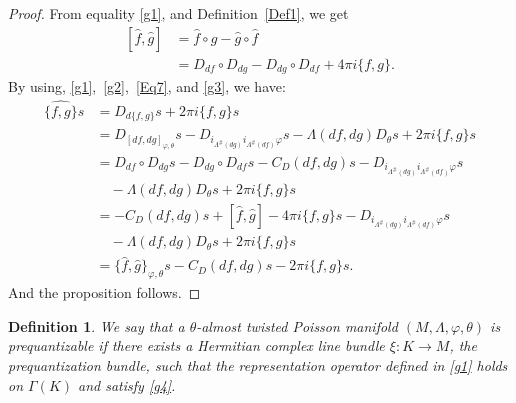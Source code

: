\documentclass[a4paper,10pt]{article}
\numberwithin{equation}{section}
\theoremstyle{plain}
\newtheorem{definition}[theorem]{Definition}
\begin{document}
	\begin{proof}
		From equality \eqref{g1}, and Definition~\ref{Def1}, we get
		\begin{align}\label{g3}
		\nonumber
		[\hat{f},\hat{g}]&=\hat{f}\circ\hat{g}-\hat{g}\circ\hat{f}\\
		&= D_{df}\circ D_{dg}-D_{dg}\circ D_{df}+ 4\pi i\{f,g\}.
		\end{align}
		By using, \eqref{g1},~\eqref{g2},~\eqref{Eq7}, and \eqref{g3}, we have:
		\begin{align*}
		\widehat{\{f,g\}}s&=D_{d\{f,g\}}s+2\pi i\{f,g\}s \\
		&=D_{[df,dg]_{\varphi,\theta}}s-D_{i_{\Lambda^{\#}(dg)}i_{\Lambda^{\#}(df)}\varphi}s-\Lambda(df,dg)D_\theta s+2\pi i\{f,g\}s\\
		&=D_{df}\circ D_{dg}s-D_{dg}\circ D_{df}s -C_D(df,dg)s-D_{i_{\Lambda^{\#}(dg)}i_{\Lambda^{\#}(df)}\varphi}s\\
		&\quad- \Lambda(df,dg)D_\theta s+2\pi i\{f,g\}s\\
		&=-C_D(df,dg)s+[\hat{f},\hat{g}]-4\pi i\{f,g\}s-D_{i_{\Lambda^{\#}(dg)}i_{\Lambda^{\#}(df)}\varphi}s\\
		&\quad- \Lambda(df,dg)D_\theta s+2\pi i\{f,g\}s\\
		&=\{\hat{f},\hat{g}\}_{\varphi,\theta}s-C_D(df,dg)s-2\pi i\{f,g\}s.
		\end{align*}
		And the proposition follows.  \end{proof}
	
	\begin{definition}\label{g5}
		We say that a  $\theta$-almost twisted Poisson manifold  $(M,\Lambda,\varphi,\theta)$ is prequantizable  if there exists a Hermitian complex line bundle $\xi: K\to M$, the prequantization bundle, such that the representation operator defined in  \eqref{g1} holds  on $\Gamma(K)$ and  satisfy  \eqref{g4}.
	\end{definition}
	
\end{document}
